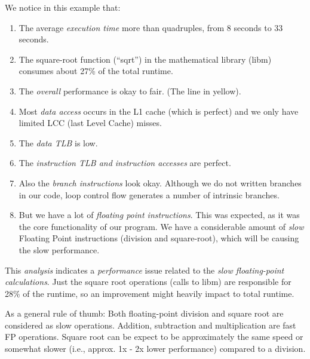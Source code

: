 We notice in this example that:
\begin{enumerate}
  \item  The average \emph{execution time} more than quadruples, from 8 seconds to 33 seconds.
  \item  The square-root function (``sqrt'') in the mathematical library (libm) consumes about 27\% of the total runtime.
  \item  The \emph{overall} performance is okay to fair. (The line in yellow).
  \item  Most \emph{data access} occurs in the L1 cache (which is perfect) and we only have limited LCC (last Level Cache) misses.
  \item  The \emph{data TLB} is low.
  \item  The \emph{instruction TLB and instruction accesses} are perfect.
  \item  Also the \emph{branch instructions} look okay. Although we do not written branches in our code, loop control flow generates a number of intrinsic branches.
  \item  But we have a lot of \emph{floating point instructions}. This was expected, as it was the core functionality of our program. We have a considerable amount of \emph{slow} Floating Point instructions (division and square-root), which will be causing the slow performance.
\end{enumerate}

This \emph{analysis} indicates a \emph{performance} issue related to the \emph{slow floating-point calculations}. Just the square root operations (calls to libm) are responsible for 28\% of the runtime, so an improvement might heavily impact to total runtime.

As a general rule of thumb: Both floating-point division and square root are considered as slow operations. Addition, subtraction and multiplication are fast FP operations. Square root can be expect to be approximately the same speed or somewhat slower (i.e., approx. 1x - 2x lower performance) compared to a division.

